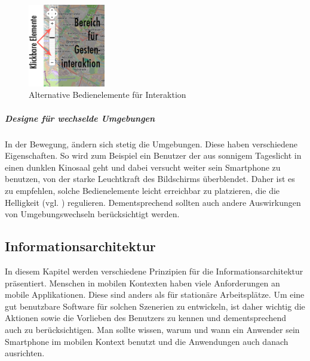 \begin{figure}
	\begin{center}
	
	\includegraphics[width=0.3\textwidth]{img/NUIbsp.png}
	\caption{Alternative Bedienelemente für Interaktion}\label{fig:nuibsp}
\end{center}
\end{figure}

\subparagraph{Designe für wechselde Umgebungen} %
\label{subp:designe_f_r_au_eneinsatz}

In der Bewegung, ändern sich stetig die Umgebungen. Diese haben verschiedene Eigenschaften. So wird zum Beispiel ein Benutzer der aus sonnigem Tageslicht in einen dunklen Kinosaal geht und dabei versucht weiter sein Smartphone zu benutzen, von der starke Leuchtkraft des Bildschirms überblendet. Daher ist es zu empfehlen, solche Bedienelemente leicht erreichbar zu platzieren, die die Helligkeit (vgl. \cite[ff Seite 418]{mobileInteraces}) regulieren. Dementsprechend sollten auch andere Auswirkungen von Umgebungswechseln berücksichtigt werden.

\subsection{Informationsarchitektur}
\label{sec:Informationsaufbereitung}

In diesem Kapitel werden verschiedene Prinzipien für die Informationsarchitektur präsentiert.
Menschen in mobilen Kontexten haben viele Anforderungen an mobile Applikationen. Diese sind anders als für stationäre Arbeitsplätze. Um eine gut benutzbare Software für solchen Szenerien zu entwickeln, ist daher wichtig die Aktionen sowie die Vorlieben des Benutzers zu kennen und dementsprechend auch zu berücksichtigen. Man sollte wissen, warum und wann ein Anwender sein Smartphone im mobilen Kontext benutzt und die Anwendungen auch danach ausrichten.

